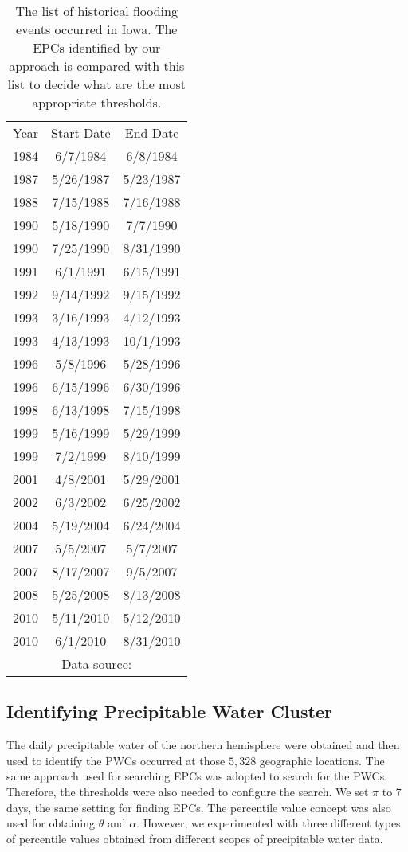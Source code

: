 \documentclass{acm_proc_article-sp}
\begin{document}
\begin{table}
\centering
\caption{The list of historical flooding events occurred in Iowa. The EPCs identified by our approach is compared with this list to decide what are the most appropriate thresholds.}
\begin{tabular}{| l | c | c |}
    \hline
    Year & Start Date & End Date \\ \hhline{|=|=|=|}
    1984 & 6/7/1984 & 6/8/1984 \\ \hline
    1987 & 5/26/1987 & 5/23/1987 \\ \hline
    1988 & 7/15/1988 & 7/16/1988 \\ \hline
    1990 & 5/18/1990 & 7/7/1990 \\ \hline
    1990 & 7/25/1990 & 8/31/1990 \\ \hline
    1991 & 6/1/1991 & 6/15/1991 \\ \hline
    1992 & 9/14/1992 & 9/15/1992 \\ \hline
    1993 & 3/16/1993 & 4/12/1993 \\ \hline
    1993 & 4/13/1993 & 10/1/1993 \\ \hline
    1996 & 5/8/1996 & 5/28/1996 \\ \hline
    1996 & 6/15/1996 & 6/30/1996 \\ \hline
    1998 & 6/13/1998 & 7/15/1998 \\ \hline
    1999 & 5/16/1999 & 5/29/1999 \\ \hline
    1999 & 7/2/1999 & 8/10/1999 \\ \hline
    2001 & 4/8/2001 & 5/29/2001 \\ \hline
    2002 & 6/3/2002 & 6/25/2002 \\ \hline
    2004 & 5/19/2004 & 6/24/2004 \\ \hline
    2007 & 5/5/2007 & 5/7/2007 \\ \hline
    2007 & 8/17/2007 & 9/5/2007 \\ \hline
    2008 & 5/25/2008 & 8/13/2008 \\ \hline
    2010 & 5/11/2010 & 5/12/2010 \\ \hline
    2010 & 6/1/2010 & 8/31/2010 \\ \hline
    \multicolumn{3}{c}{Data source: \cite{Iowa:floods}}
\end{tabular}
\label{tab:EPCs}
\end{table}

\subsection{Identifying Precipitable Water Cluster}
The daily precipitable water of the northern hemisphere were obtained and then used to identify the PWCs occurred at those $5,328$ geographic locations. The same approach used for searching EPCs was adopted to search for the PWCs. Therefore, the thresholds were also needed to configure the search. We set $\pi$ to 7 days, the same setting for finding EPCs. The percentile value concept was also used for obtaining $\theta$ and $\alpha$. However, we experimented with three different types of percentile values obtained from different scopes of precipitable water data.
\end{document}
